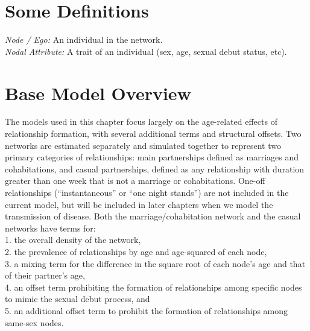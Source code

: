 \documentclass [11pt, proquest] {uwthesis}[2015/03/03]
\begin{document}
\hypertarget{some-definitions}{%
\section{Some Definitions}\label{some-definitions}}

\emph{Node / Ego:} An individual in the network.\\
\emph{Nodal Attribute:} A trait of an individual (sex, age, sexual debut status, etc).

\hypertarget{base-model-overview}{%
\section{Base Model Overview}\label{base-model-overview}}

The models used in this chapter focus largely on the age-related effects of relationship formation, with several additional terms and structural offsets. Two networks are estimated separately and simulated together to represent two primary categories of relationships: main partnerships defined as marriages and cohabitations, and casual partnerships, defined as any relationship with duration greater than one week that is not a marriage or cohabitations. One-off relationships (``instantaneous'' or ``one night stands'') are not included in the current model, but will be included in later chapters when we model the transmission of disease. Both the marriage/cohabitation network and the casual networks have terms for:\\
1. the overall density of the network,\\
2. the prevalence of relationships by age and age-squared of each node,\\
3. a mixing term for the difference in the square root of each node's age and that of their partner's age,\\
4. an offset term prohibiting the formation of relationships among specific nodes to mimic the sexual debut process, and\\
5. an additional offset term to prohibit the formation of relationships among same-sex nodes.
\end{document}
